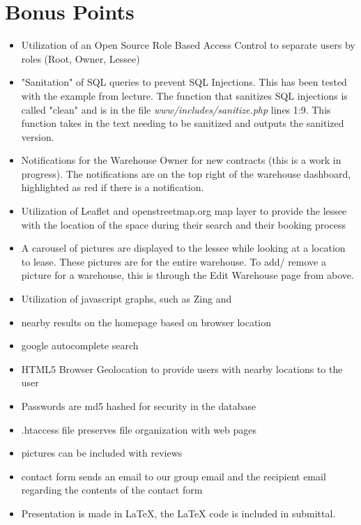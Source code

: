 \section*{Bonus Points}
\begin{itemize}
\item Utilization of an Open Source Role Based Access Control \cite{abiusx} to separate users by roles (Root, Owner, Lessee)
\item "Sanitation" of SQL queries to prevent SQL Injections.  This has been tested with the example from lecture.  The function that sanitizes SQL injections is called "clean" and is in the file \textit{www/includes/sanitize.php} lines 1:9.  This function takes in the text needing to be sanitized and outputs the sanitized version.
\item Notifications for the Warehouse Owner for new contracts (this is a work in progress).  The notifications are on the top right of the warehouse dashboard, highlighted as red if there is a notification.
\item Utilization of Leaflet and openstreetmap.org map layer to provide the lessee with the location of the space during their search and their booking process
\item A carousel of pictures are displayed to the lessee while looking at a location to lease.  These pictures are for the entire warehouse.  To add/ remove a picture for a warehouse, this is through the Edit Warehouse page from above.
\item Utilization of javascript graphs, such as Zing and 
\item nearby results on the homepage based on browser location
\item google autocomplete search
\item HTML5 Browser Geolocation to provide users with nearby locations to the user
\item Passwords are md5 hashed for security in the database
\item .htaccess file preserves file organization with web pages
\item pictures can be included with reviews
\item contact form sends an email to our group email and the recipient email regarding the contents of the contact form
\item Presentation is made in LaTeX, the LaTeX code is included in submittal. 
\end{itemize}

